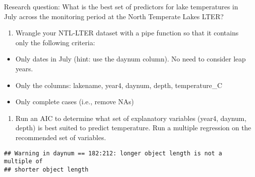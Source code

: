 \documentclass[]{article}
\newenvironment{Shaded}{\begin{snugshade}}{\end{snugshade}}
\newcommand{\KeywordTok}[1]{\textcolor[rgb]{0.13,0.29,0.53}{\textbf{#1}}}
\newcommand{\DecValTok}[1]{\textcolor[rgb]{0.00,0.00,0.81}{#1}}
\newcommand{\StringTok}[1]{\textcolor[rgb]{0.31,0.60,0.02}{#1}}
\newcommand{\CommentTok}[1]{\textcolor[rgb]{0.56,0.35,0.01}{\textit{#1}}}
\newcommand{\OperatorTok}[1]{\textcolor[rgb]{0.81,0.36,0.00}{\textbf{#1}}}
\newcommand{\NormalTok}[1]{#1}
\providecommand{\tightlist}{%
  \setlength{\itemsep}{0pt}\setlength{\parskip}{0pt}}
\begin{document}
Research question: What is the best set of predictors for lake
temperatures in July across the monitoring period at the North Temperate
Lakes LTER?

\begin{enumerate}
\def\labelenumi{\arabic{enumi}.}
\setcounter{enumi}{10}
\tightlist
\item
  Wrangle your NTL-LTER dataset with a pipe function so that it contains
  only the following criteria:
\end{enumerate}

\begin{itemize}
\tightlist
\item
  Only dates in July (hint: use the daynum column). No need to consider
  leap years.
\item
  Only the columns: lakename, year4, daynum, depth, temperature\_C
\item
  Only complete cases (i.e., remove NAs)
\end{itemize}

\begin{enumerate}
\def\labelenumi{\arabic{enumi}.}
\setcounter{enumi}{11}
\tightlist
\item
  Run an AIC to determine what set of explanatory variables (year4,
  daynum, depth) is best suited to predict temperature. Run a multiple
  regression on the recommended set of variables.
\end{enumerate}

\begin{Shaded}
\end{Shaded}

\begin{verbatim}
## Warning in daynum == 182:212: longer object length is not a multiple of
## shorter object length
\end{verbatim}
\end{document}
